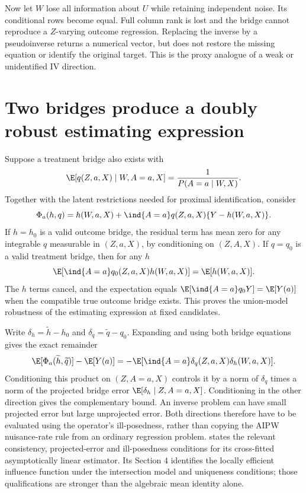 Now let $W$ lose all information about $U$ while retaining independent
noise. Its conditional rows become equal. Full column rank is lost and the
bridge cannot reproduce a $Z$-varying outcome regression. Replacing
the inverse by a pseudoinverse returns a numerical vector, but does not
restore the missing equation or identify the original target. This is
the proxy analogue of a weak or unidentified IV direction.

\section{Two bridges produce a doubly robust estimating expression}
\label{r3:proximal-score}
Suppose a treatment bridge also exists with
\begin{equation}
 \E[q(Z,a,X)\mid W,A=a,X]
       =\frac1{P(A=a\mid W,X)}.
 \label{r3:treatment-bridge}
\end{equation}
Together with the latent restrictions needed for proximal identification,
consider
\begin{equation}
 \Phi_a(h,q)=h(W,a,X)+\ind\{A=a\}q(Z,a,X)
                                  \{Y-h(W,a,X)\}.
 \label{r3:proximal-augmented}
\end{equation}
If $h=h_0$ is a valid outcome bridge, the residual term has mean zero
for any integrable $q$ measurable in $(Z,a,X)$, by conditioning on
$(Z,A,X)$. If $q=q_0$ is a valid treatment bridge, then for any $h$
\[
 \E[\ind\{A=a\}q_0(Z,a,X)h(W,a,X)]=\E[h(W,a,X)].
\]
The $h$ terms cancel, and the expectation equals
$\E[\ind\{A=a\}q_0Y]=\E[Y(a)]$ when the compatible true
outcome bridge exists. This proves the union-model robustness of
the estimating expression at fixed candidates.

Write $\delta_h=\widetilde h-h_0$ and
$\delta_q=\widetilde q-q_0$. Expanding and using both bridge
equations gives the exact remainder
\begin{equation}
 \E[\Phi_a(\widetilde h,\widetilde q)]-\E[Y(a)]
 =-\E[\ind\{A=a\}\delta_q(Z,a,X)\delta_h(W,a,X)].
 \label{r3:proximal-remainder}
\end{equation}
Conditioning this product on $(Z,A=a,X)$ controls it by a norm of
$\delta_q$ times a norm of the projected bridge error
$\E[\delta_h\mid Z,A=a,X]$. Conditioning in the other direction
gives the complementary bound. An inverse problem can have small
projected error but large unprojected error. Both directions therefore
have to be evaluated using the operator's ill-posedness, rather than
copying the AIPW nuisance-rate rule from an ordinary regression problem.
\citet[Section 3.2, Assumptions 2--3 and Theorem 2]{ghassami2022}
states the relevant consistency, projected-error and ill-posedness
conditions for its cross-fitted asymptotically linear estimator.
Its Section 4 identifies the locally efficient influence function
under the intersection model and uniqueness conditions; those
qualifications are stronger than the algebraic mean identity alone.

